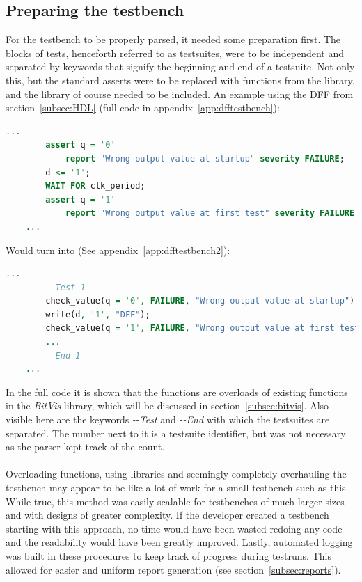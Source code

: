 \documentclass[11pt,british]{article}
\begin{document}
\subsection{Preparing the testbench}
\label{subsec:preparing}
For the testbench to be properly parsed, it needed some preparation first. The blocks of tests, henceforth referred to as testsuites, were to be independent and separated by keywords that signify the beginning and end of a testsuite. Not only this, but the standard asserts were to be replaced with functions from the library, and the library of course needed to be included. An example using the \gls{DFF} from section~\ref{subsec:HDL} (full code in appendix~\ref{app:dfftestbench}):
\begin{lstlisting}[language=VHDL, tabsize=4, frame=single, framesep=2mm, belowskip=8pt, aboveskip=8pt, showstringspaces=false, basicstyle=\footnotesize]
	...
		assert q = '0'
			report "Wrong output value at startup" severity FAILURE;
		d <= '1';
     	WAIT FOR clk_period;
     	assert q = '1'
			report "Wrong output value at first test" severity FAILURE;
	...
\end{lstlisting}
Would turn into (See appendix~\ref{app:dfftestbench2}):
\begin{lstlisting}[language=VHDL, tabsize=4, frame=single, framesep=2mm, belowskip=8pt, aboveskip=8pt, showstringspaces=false, basicstyle=\footnotesize]
	...
		--Test 1
		check_value(q = '0', FAILURE, "Wrong output value at startup");
		write(d, '1', "DFF");
		check_value(q = '1', FAILURE, "Wrong output value at first test");
		...
		--End 1
	...
\end{lstlisting}
In the full code it is shown that the functions are overloads of existing functions in the \emph{BitVis} library, which will be discussed in section~\ref{subsec:bitvis}. Also visible here are the keywords \emph{-\--Test} and \emph{-\--End} with which the testsuites are separated. The number next to it is a testsuite identifier, but was not necessary as the parser kept track of the count.
\\
\\
Overloading functions, using libraries and seemingly completely overhauling the testbench may appear to be like a lot of work for a small testbench such as this. While true, this method was easily scalable for testbenches of much larger sizes and with designs of greater complexity. If the developer created a testbench starting with this approach, no time would have been wasted redoing any code and the readability would have been greatly improved. Lastly, automated logging was built in these procedures to keep track of progress during testruns. This allowed for easier and uniform report generation (see section~\ref{subsec:reports}).
\end{document}
